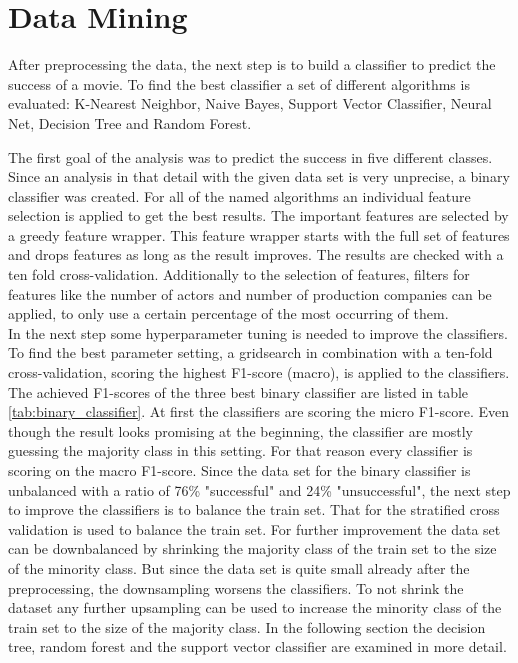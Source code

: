 \chapter{Data Mining}
\label{cha:data_mining}

After preprocessing the data, the next step is to build a classifier to predict the success of a movie. To find the best classifier a set of different algorithms is evaluated:
K-Nearest Neighbor, 
Naive Bayes, 
Support Vector Classifier, 
Neural Net, 
Decision Tree and 
Random Forest.

The first goal of the analysis was to predict the success in five different classes. Since an analysis in that detail with the given data set is very unprecise, a binary classifier was created.
For all of the named algorithms an individual feature selection is applied to get the best results. The important features are selected by a greedy feature wrapper. This feature wrapper starts with the full set of features and drops features as long as the result improves. The results are checked with a ten fold cross-validation. Additionally to the selection of features, filters for features like the number of actors and number of production companies can be applied, to only use a certain percentage of the most occurring of them. \\
In the next step some hyperparameter tuning is needed to improve the classifiers. To find the best parameter setting, a gridsearch in combination with a ten-fold cross-validation, scoring the highest F1-score (macro), is applied to the classifiers.
The achieved F1-scores of the three best binary classifier are listed in table \ref{tab:binary_classifier}. 
At first the classifiers are scoring the micro F1-score. Even though the result looks promising at the beginning, the classifier are mostly guessing the majority class in this setting. For that reason every classifier is scoring on the macro F1-score. Since the data set for the binary classifier is unbalanced with a ratio of 76\% "successful" and 24\% "unsuccessful", the next step to improve the classifiers is to balance the train set. That for the stratified cross validation is used to balance the train set. For further improvement the data set can be downbalanced by shrinking the majority class of the train set to the size of the minority class. But since the data set is quite small already after the preprocessing, the downsampling worsens the classifiers. To not shrink the dataset any further upsampling can be used to increase the minority class of the train set to the size of the majority class. In the following section the decision tree, random forest and the support vector classifier are examined in more detail.

